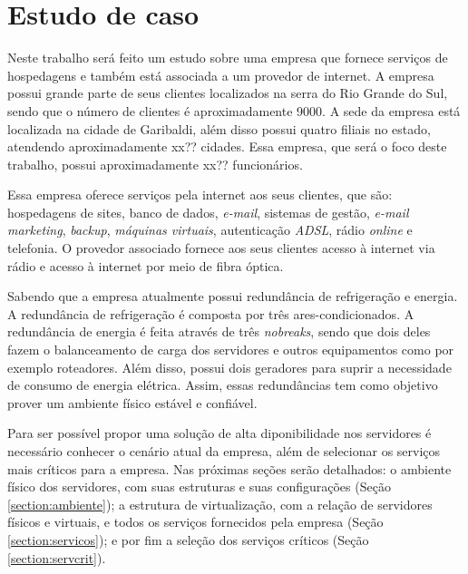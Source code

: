 \chapter{Estudo de caso}
\label{cap:estudodecaso}

Neste trabalho será feito um estudo sobre uma empresa que fornece serviços de hospedagens e também está associada a um 
provedor de internet\footnotemark[1]. 
A empresa possui grande parte de seus clientes localizados na serra do Rio Grande do Sul, sendo que o número de clientes é aproximadamente 9000. 
A sede da empresa está localizada na cidade de Garibaldi, além disso possui quatro filiais no estado, atendendo aproximadamente xx?? cidades.
Essa empresa, que será o foco deste trabalho, possui aproximadamente xx?? funcionários.


Essa empresa oferece serviços pela internet aos seus clientes, que são: hospedagens de sites, banco de dados, \textit{e-mail}, sistemas de gestão, 
\textit{e-mail marketing}, \textit{backup}, \textit{máquinas virtuais}, autenticação \textit{ADSL}, rádio \textit{online} e telefonia.
O provedor associado fornece aos seus clientes acesso à internet via rádio e acesso à internet por meio de fibra óptica.

Sabendo que a empresa atualmente possui redundância de refrigeração e energia. A redundância de refrigeração é composta por três ares-condicionados. 
A redundância de energia é feita através de três \textit{nobreaks}, sendo que dois deles fazem o balanceamento de carga dos servidores e outros 
equipamentos como por exemplo roteadores. Além disso, possui dois geradores para suprir a necessidade de consumo de energia elétrica. 
Assim, essas redundâncias tem como objetivo prover um ambiente físico estável e confiável.

Para ser possível propor uma solução de alta diponibilidade nos servidores é necessário conhecer o cenário atual da empresa, além de selecionar 
os serviços mais críticos para a empresa. Nas próximas seções serão detalhados: o ambiente físico dos servidores, com suas estruturas e suas 
configurações (Seção \ref{section:ambiente}); a estrutura de virtualização, com a relação de servidores físicos e virtuais, e todos os 
serviços fornecidos pela empresa (Seção \ref{section:servicos}); e por fim a seleção dos serviços críticos (Seção \ref{section:servcrit}).

